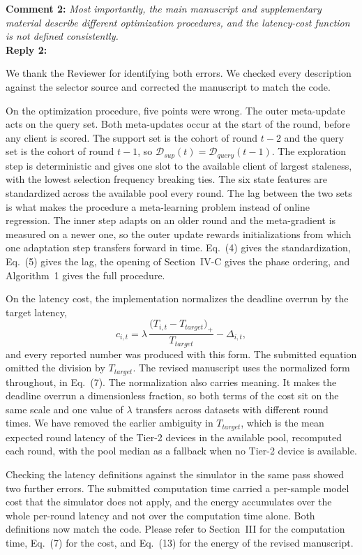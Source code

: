 \documentclass[10pt]{article}
\begin{document}
\noindent
\textbf{Comment 2:} \textit{Most importantly, the main manuscript and supplementary material describe different optimization procedures, and the latency-cost function is not defined consistently.}\\
\noindent
\textbf{Reply 2:} {We thank the Reviewer for identifying both errors. We checked every description against the selector source and corrected the manuscript to match the code.

On the optimization procedure, five points were wrong. The outer meta-update acts on the query set. Both meta-updates occur at the start of the round, before any client is scored. The support set is the cohort of round $t-2$ and the query set is the cohort of round $t-1$, so $\mathcal{D}_{sup}(t)=\mathcal{D}_{query}(t-1)$. The exploration step is deterministic and gives one slot to the available client of largest staleness, with the lowest selection frequency breaking ties. The six state features are standardized across the available pool every round. The lag between the two sets is what makes the procedure a meta-learning problem instead of online regression. The inner step adapts on an older round and the meta-gradient is measured on a newer one, so the outer update rewards initializations from which one adaptation step transfers forward in time. Eq.~(4) gives the standardization, Eq.~(5) gives the lag, the opening of Section~IV-C gives the phase ordering, and Algorithm~1 gives the full procedure.

On the latency cost, the implementation normalizes the deadline overrun by the target latency,
\[
c_{i,t}=\lambda\,\frac{\bigl(T_{i,t}-T_{target}\bigr)_{+}}{T_{target}}-\Delta_{i,t},
\]
and every reported number was produced with this form. The submitted equation omitted the division by $T_{target}$. The revised manuscript uses the normalized form throughout, in Eq.~(7). The normalization also carries meaning. It makes the deadline overrun a dimensionless fraction, so both terms of the cost sit on the same scale and one value of $\lambda$ transfers across datasets with different round times. We have removed the earlier ambiguity in $T_{target}$, which is the mean expected round latency of the Tier-2 devices in the available pool, recomputed each round, with the pool median as a fallback when no Tier-2 device is available.

Checking the latency definitions against the simulator in the same pass showed two further errors. The submitted computation time carried a per-sample model cost that the simulator does not apply, and the energy accumulates over the whole per-round latency and not over the computation time alone. Both definitions now match the code. Please refer to Section~III for the computation time, Eq.~(7) for the cost, and Eq.~(13) for the energy of the revised manuscript.}\\
\end{document}
